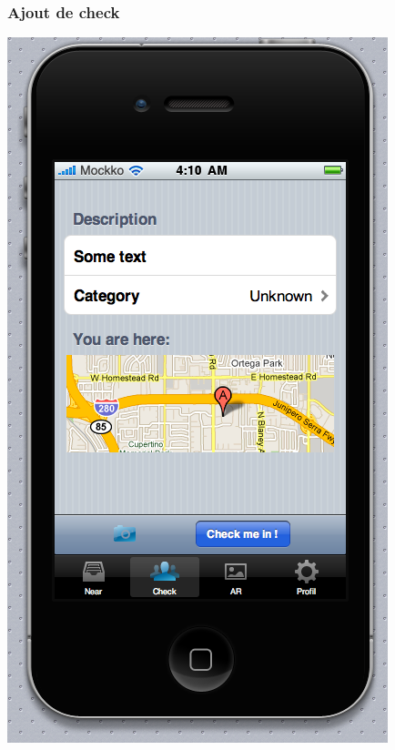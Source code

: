 \documentclass[a4paper,12pt]{report}
\begin{document}
\begin{onehalfspace}
\subsubsection{Ajout de check}
\begin{center}
\includegraphics[height=\thehauteurscreen cm]{img/3_check.png}
\end{center}


\end{onehalfspace}
\end{document}
